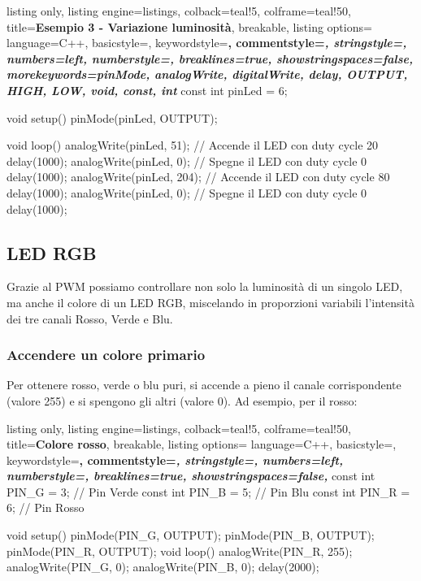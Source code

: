 \begin{tcblisting}{
    listing only,
    listing engine=listings,
    colback=teal!5,
    colframe=teal!50,
    title=\textbf{Esempio 3 - Variazione luminosità},
    breakable,
    listing options={
        language=C++,
        basicstyle=\ttfamily\small,
        keywordstyle=\color{blue!80!black}\bfseries,
        commentstyle=\color{green!50!black}\itshape,
        stringstyle=\color{orange!80!black},
        numbers=left,
        numberstyle=\tiny\color{gray},
        breaklines=true,
        showstringspaces=false,
        morekeywords={pinMode, analogWrite, digitalWrite, delay, OUTPUT, HIGH, LOW, void, const, int}
    }
}
const int pinLed = 6;

void setup() {
  pinMode(pinLed, OUTPUT);
}

void loop() {
    analogWrite(pinLed, 51);  // Accende il LED con duty cycle 20 %
    delay(1000);               
    analogWrite(pinLed, 0);   // Spegne il LED con duty cycle 0 %
    delay(1000);               
    analogWrite(pinLed, 204); // Accende il LED con duty cycle 80 %
    delay(1000);              
    analogWrite(pinLed, 0);   // Spegne il LED con duty cycle 0 %
    delay(1000);              
}
\end{tcblisting}


\subsection{LED RGB}

Grazie al PWM possiamo controllare non solo la luminosità di un singolo LED, ma anche il colore di un LED RGB, miscelando in proporzioni variabili l'intensità dei tre canali Rosso, Verde e Blu.

\subsubsection*{Accendere un colore primario}

Per ottenere rosso, verde o blu puri, si accende a pieno il canale corrispondente (valore 255) e si spengono gli altri (valore 0). Ad esempio, per il rosso:

\begin{tcblisting}{
    listing only,
    listing engine=listings,
    colback=teal!5,
    colframe=teal!50,
    title=\textbf{Colore rosso},
    breakable,
    listing options={
        language=C++,
        basicstyle=\ttfamily\small,
        keywordstyle=\color{blue!80!black}\bfseries,
        commentstyle=\color{green!50!black}\itshape,
        stringstyle=\color{orange!80!black},
        numbers=left,
        numberstyle=\tiny\color{gray},
        breaklines=true,
        showstringspaces=false,
    }
}
const int PIN_G = 3;  // Pin Verde
const int PIN_B = 5;  // Pin Blu
const int PIN_R = 6;  // Pin Rosso

void setup() {
    pinMode(PIN_G, OUTPUT);
    pinMode(PIN_B, OUTPUT);
    pinMode(PIN_R, OUTPUT);
}
void loop() {
    analogWrite(PIN_R, 255);
    analogWrite(PIN_G, 0);
    analogWrite(PIN_B, 0);
    delay(2000);
}
\end{tcblisting}


